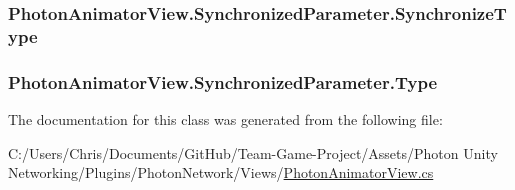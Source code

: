 \subsubsection[{\texorpdfstring{Synchronize\+Type}{SynchronizeType}}]{ Photon\+Animator\+View.\+Synchronized\+Parameter.\+Synchronize\+Type}\hypertarget{class_photon_animator_view_1_1_synchronized_parameter_a3bca909eb8a9c74c41c40c5ade8851f3}{}\label{class_photon_animator_view_1_1_synchronized_parameter_a3bca909eb8a9c74c41c40c5ade8851f3}
\subsubsection[{\texorpdfstring{Type}{Type}}]{ Photon\+Animator\+View.\+Synchronized\+Parameter.\+Type}\hypertarget{class_photon_animator_view_1_1_synchronized_parameter_aed91d06642473f7978a3675b9e08e5de}{}\label{class_photon_animator_view_1_1_synchronized_parameter_aed91d06642473f7978a3675b9e08e5de}


The documentation for this class was generated from the following file\+:\begin{DoxyCompactItemize}
\item 
C\+:/\+Users/\+Chris/\+Documents/\+Git\+Hub/\+Team-\/\+Game-\/\+Project/\+Assets/\+Photon Unity Networking/\+Plugins/\+Photon\+Network/\+Views/\hyperlink{_photon_animator_view_8cs}{Photon\+Animator\+View.\+cs}\end{DoxyCompactItemize}
